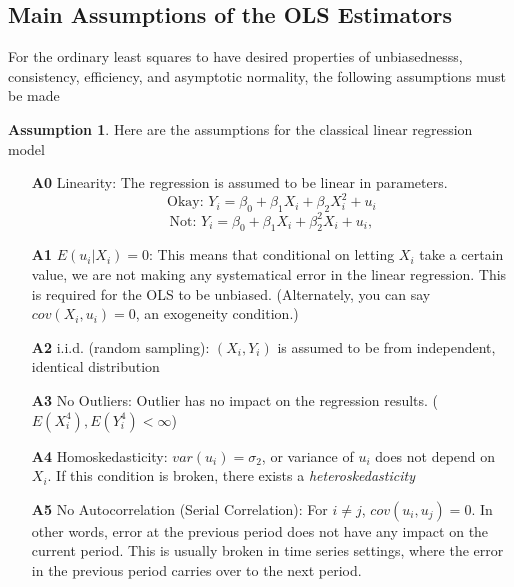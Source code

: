 \documentclass[12pt]{article}
\theoremstyle{definition}
\theoremstyle{property}
\theoremstyle{assumption}
\newtheorem{assumption}{Assumption}[section]
\theoremstyle{example}
\theoremstyle{comment}
\begin{document}
\subsection{Main Assumptions of the OLS Estimators}
For the ordinary least squares to have desired properties of unbiasednesss, consistency, efficiency, and asymptotic normality, the following assumptions must be made
\begin{mdframed}[backgroundcolor=blue!5] 
\begin{assumption} Here are the assumptions for the classical linear regression model
\begin{itemize}
\item[\textbf{A0}] Linearity: The regression is assumed to be linear in parameters.
\[
\text{Okay: } Y_i = \beta_0 + \beta_1X_i + \beta_2X_i^2+u_i 
\]
\[
\text{Not: } Y_i = \beta_0 + \beta_1X_i + \beta_2^2X_i+u_i,
\]
\item[\textbf{A1}] $E(u_i|X_i)=0$: This means that conditional on letting $X_i$ take a certain value, we are not making any systematical error in the linear regression. This is required for the OLS to be unbiased. (Alternately, you can say $cov(X_i,u_i)=0$, an exogeneity condition.)
\item[\textbf{A2}] i.i.d. (random sampling): $(X_i,Y_i)$ is assumed to be from independent, identical distribution
\item[\textbf{A3}] No Outliers: Outlier has no impact on the regression results. ($E(X_i^4), E(Y_i^4)<\infty$)
\item[\textbf{A4}] Homoskedasticity: $var(u_i)=\sigma_2$, or variance of $u_i$ does not depend on $X_i$. If this condition is broken, there exists a \textit{heteroskedasticity}
\item[\textbf{A5}] No Autocorrelation (Serial Correlation): For $i\neq j$, $cov(u_i,u_j)=0$. In other words, error at the previous period does not have any impact on the current period. This is usually broken in time series settings, where the error in the previous period carries over to the next period.
\end{itemize}
\end{assumption}
\end{mdframed}
\end{document}
